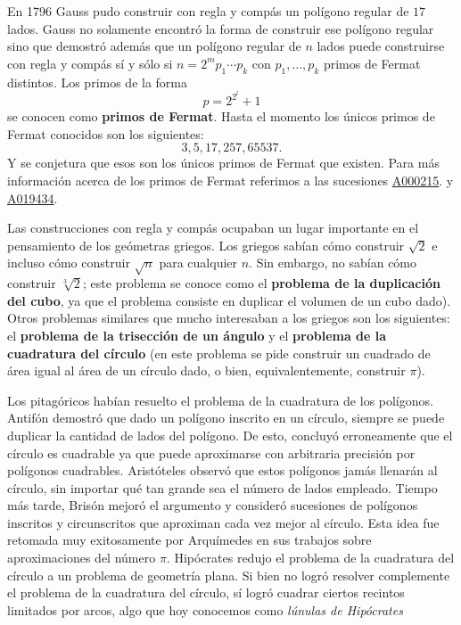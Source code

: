 En 1796 Gauss pudo construir con regla y compás un polígono regular de $17$
lados. Gauss no solamente encontró la forma de construir ese polígono regular
sino que demostró además que un polígono regular de $n$ lados puede construirse
con regla y compás sí y sólo si $n=2^mp_1\cdots p_k$ con $p_1,\dots,p_k$ primos
de Fermat distintos. Los primos de la forma 
\[
	p=2^{2^l}+1
\]
se conocen como \textbf{primos de Fermat}. Hasta el momento los únicos primos
de Fermat conocidos son los siguientes:
\[
	3,5,17,257,65537.
\]
Y se conjetura que esos son los únicos primos de Fermat que existen. Para más
información acerca de los primos de Fermat referimos a
las sucesiones 
\href{https://oeis.org/A000215}{A000215}.
y \href{https://oeis.org/A019434}{A019434}.

Las construcciones con regla y compás ocupaban un lugar importante en el
pensamiento de los geómetras griegos. Los griegos sabían cómo construir
$\sqrt{2}$ e incluso cómo construir $\sqrt{n}$ para cualquier $n$. Sin embargo,
no sabían cómo construir $\sqrt[3]{2}$; este problema se conoce como el
\textbf{problema de la duplicación del cubo}, ya que el problema consiste en
duplicar el volumen de un cubo dado). Otros problemas similares que mucho
interesaban a los griegos son los siguientes: el
\textbf{problema de la trisección de un ángulo} y el \textbf{problema de la
cuadratura del círculo} (en este problema se pide construir un cuadrado de área
igual al área de un círculo dado, o bien, equivalentemente, construir $\pi$).

Los pitagóricos habían resuelto el problema de la cuadratura de los polígonos.
Antifón demostró que dado un polígono inscrito en un círculo, siempre se puede
duplicar la cantidad de lados del polígono. De esto, concluyó erroneamente que
el círculo es cuadrable ya que puede aproximarse con arbitraria precisión por
polígonos cuadrables. Aristóteles observó que estos polígonos jamás llenarán al
círculo, sin importar qué tan grande sea el número de lados empleado. Tiempo
más tarde, Brisón mejoró el argumento y consideró sucesiones de polígonos
inscritos y circunscritos que aproximan cada vez mejor al círculo. Esta idea
fue retomada muy exitosamente por Arquímedes en sus trabajos sobre
aproximaciones del número $\pi$. Hipócrates redujo el problema de la cuadratura
del círculo a un problema de geometría plana. Si bien no logró resolver
complemente el problema de la cuadratura del círculo, sí logró cuadrar ciertos
recintos limitados por arcos, algo que hoy conocemos como \emph{lúnulas de
Hipócrates}

